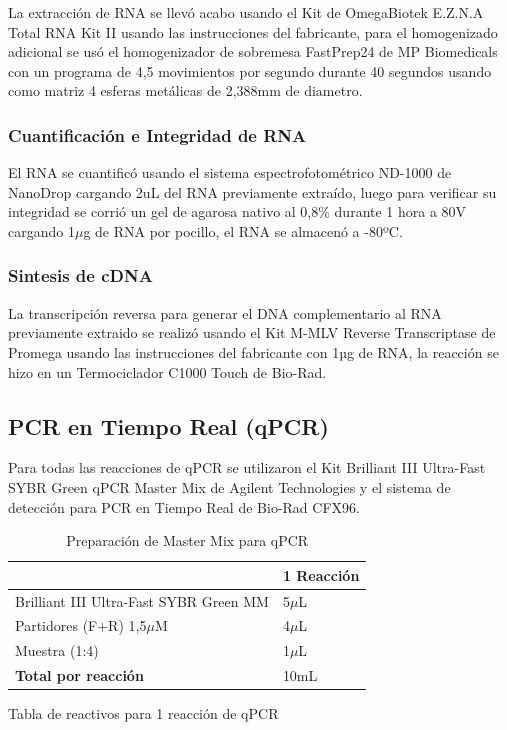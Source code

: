 \documentclass[12pt,a4paper,]{article}
\begin{document}
La extracción de RNA se llevó acabo usando el Kit de OmegaBiotek E.Z.N.A
Total RNA Kit II usando las instrucciones del fabricante, para el
homogenizado adicional se usó el homogenizador de sobremesa FastPrep24
de MP Biomedicals con un programa de 4,5 movimientos por segundo durante
40 segundos usando como matriz 4 esferas metálicas de 2,388mm de
diametro.

\subsubsection{Cuantificación e Integridad de
RNA}\label{cuantificaciuxf3n-e-integridad-de-rna}

El RNA se cuantificó usando el sistema espectrofotométrico ND-1000 de
NanoDrop cargando 2uL del RNA previamente extraído, luego para verificar
su integridad se corrió un gel de agarosa nativo al 0,8\% durante 1 hora
a 80V cargando 1$\mu$g de RNA por pocillo, el RNA se almacenó a -80ºC.

\subsubsection{Sintesis de cDNA}\label{sintesis-de-cdna}

La transcripción reversa para generar el DNA complementario al RNA
previamente extraido se realizó usando el Kit M-MLV Reverse
Transcriptase de Promega usando las instrucciones del fabricante con 1µg
de RNA, la reacción se hizo en un Termociclador C1000 Touch de Bio-Rad.

\subsection{PCR en Tiempo Real (qPCR)}\label{pcr-en-tiempo-real-qpcr}

Para todas las reacciones de qPCR se utilizaron el Kit Brilliant III
Ultra-Fast SYBR Green qPCR Master Mix de Agilent Technologies y el
sistema de detección para PCR en Tiempo Real de Bio-Rad CFX96.

\begin{table}[h!]
\sffamily
\begin{center}
\begin{threeparttable}
\caption{Preparación de Master Mix para qPCR}\label{mmix}
\begin{tabularx}{13cm}{X l}
\toprule
 & 1 Reacción \\
\midrule
Brilliant III Ultra-Fast SYBR Green MM & 5$\mu$L \\
Partidores (F+R) 1,5$\mu$M & 4$\mu$L \\
Muestra (1:4) & 1$\mu$L \\
\textbf{Total por reacción} & 10mL \\
\bottomrule
\end{tabularx}
\begin{tablenotes}
    \item Tabla de reactivos para 1 reacción de qPCR
\end{tablenotes}
\end{threeparttable}
\end{center}
\end{table}
\end{document}
